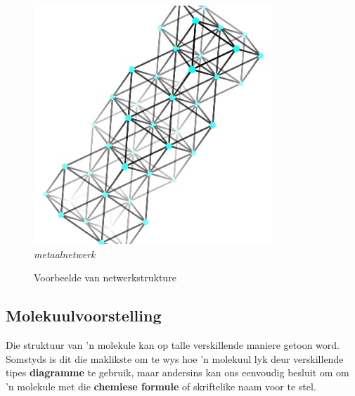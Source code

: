 \begin{figure}[H]
\begin{center}
\begin{minipage}[c]{5 cm}
    \includegraphics[width=0.8\textwidth]{photos/copper_structure.png}   \\ 
    \textsl{metaalnetwerk}
  \end{minipage}
\caption{Voorbeelde van netwerkstrukture}
\end{center}
\end{figure}
            \subsection*{Molekuulvoorstelling}
            \nopagebreak
        \label{m38120*id307557}
Die struktuur van 'n molekule kan op talle verskillende maniere getoon word. Somstyds is dit die maklikste om te wys hoe 'n molekuul lyk deur verskillende tipes \textbf{diagramme} te gebruik, maar andersins kan ons eenvoudig besluit om om 'n molekule met die \textbf{chemiese formule} of skriftelike naam voor te stel.\par 
